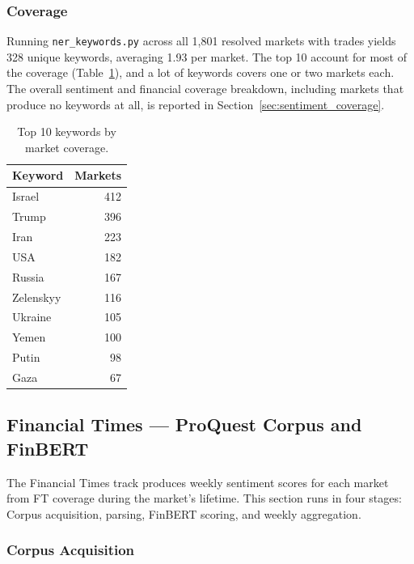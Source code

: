 \documentclass[11pt]{article}
\begin{document}
\subsubsection*{Coverage}

Running \texttt{ner\_keywords.py} across all 1,801 resolved markets
with trades yields 328 unique keywords, averaging 1.93
per market. The top 10 account for most of the coverage
(Table~\ref{tab:top_keywords}), and a lot of  keywords
covers one or two markets each. The overall sentiment and financial
coverage breakdown, including markets that produce no keywords at
all, is reported in Section~\ref{sec:sentiment_coverage}.

\begin{table}[H]
\centering
\caption{Top 10 keywords by market coverage.}
\label{tab:top_keywords}
\small
\begin{tabularx}{0.6\textwidth}{X r}
\toprule
\textbf{Keyword} & \textbf{Markets} \\
\midrule
Israel    & 412 \\
Trump     & 396 \\
Iran      & 223 \\
USA       & 182 \\
Russia    & 167 \\
Zelenskyy & 116 \\
Ukraine   & 105 \\
Yemen     & 100 \\
Putin     &  98 \\
Gaza      &  67 \\
\bottomrule
\end{tabularx}
\end{table}




\subsection{Financial Times --- ProQuest Corpus and FinBERT}
\label{sec:ft_finbert}

The Financial Times track produces weekly sentiment scores for each
market from FT coverage during the market's lifetime. This section runs in four stages: Corpus acquisition, parsing, FinBERT scoring, and weekly aggregation.



\subsubsection*{Corpus Acquisition}
\label{sec:corpus_acquisition}
\end{document}
